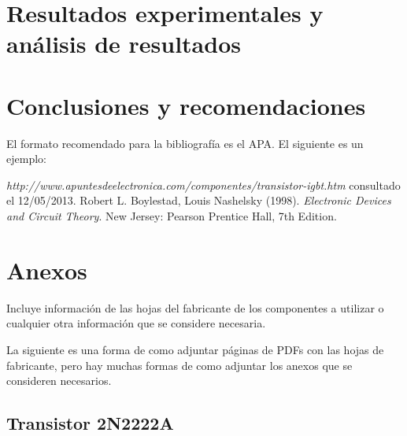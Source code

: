 \documentclass[12pt,letterpaper]{article}     %
\begin{document}
\newpage
\section{Resultados experimentales y análisis de resultados}

\newpage
\section{Conclusiones y recomendaciones}



\newpage

El formato recomendado para la bibliografía es el APA. El siguiente es un ejemplo:

\begin{thebibliography}{}
 \emph{http://www.apuntesdeelectronica.com/componentes/transistor-igbt.htm} consultado el 12/05/2013.
 Robert L. Boylestad, Louis Nashelsky (1998). \emph{Electronic Devices and Circuit Theory}. New Jersey:  Pearson Prentice Hall, 7th Edition.



\end{thebibliography}


\newpage


\appendix
\section{Anexos}

Incluye información de las hojas del fabricante de los componentes a utilizar o cualquier otra información que se considere necesaria.

La siguiente es una forma de como adjuntar páginas de PDFs con las hojas de fabricante, pero hay muchas formas de como adjuntar los anexos que se consideren necesarios.

\subsection{Transistor 2N2222A}




\end{document}
